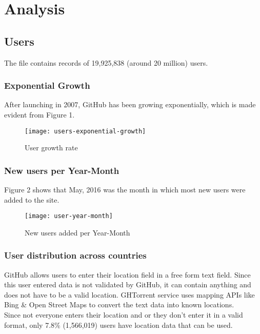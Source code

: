\newpage

\section{Analysis}

\subsection{Users}

The  file contains records of 19,925,838 (around 20 million) users.

\subsubsection{Exponential Growth}

After launching in 2007, GitHub has been growing exponentially, which is made evident from Figure 1.

\begin{figure}[htb]
\centering
\texttt{[image: users-exponential-growth]}
\caption{User growth rate}
\end{figure}


\subsubsection{New users per Year-Month}

Figure 2 shows that May, 2016 was the month in which most new users were added to the site.

\begin{figure}[htb]
\centering
\texttt{[image: user-year-month]}
\caption{New users added per Year-Month}
\end{figure}

\subsubsection{User distribution across countries}

GitHub allows users to enter their location field in a free form text field.
Since this user entered data is not validated by GitHub, it can contain anything and does not have to be a valid location.
GHTorrent service uses mapping APIs like Bing \& Open Street Maps to convert the text data into known locations. \\

Since not everyone enters their location and or they don't enter it in a valid format, only 7.8\% (1,566,019) users have location data that can be used. \\


